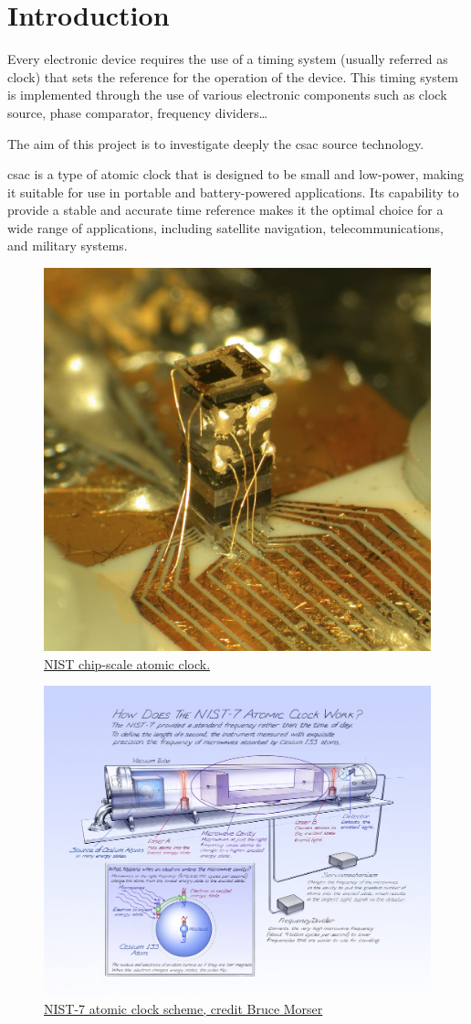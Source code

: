 \section{Introduction}
\label{sec:introduction}

Every electronic device requires the use of a timing system (usually referred as clock) that sets the reference for the operation of the device.
This timing system is implemented through the use of various electronic components such as clock source, phase comparator, frequency dividers\dots

The aim of this project is to investigate deeply the \acrfull{csac} source technology.

\acrshort{csac} is a type of atomic clock that is designed to be small and low-power, making it suitable for use in portable and battery-powered applications.
Its capability to provide a stable and accurate time reference makes it the optimal choice for a wide range of applications, including satellite navigation, telecommunications, and military systems.

\begin{figure}[H]
    \centering
    \includegraphics[width=.5\textwidth]{img/first_atomic_clock.jpg}
    \caption{\href{https://www.nist.gov/news-events/news/2004/08/nist-unveils-chip-scale-atomic-clock}{NIST chip-scale atomic clock.}}
\end{figure}

\begin{figure}[H]
    \centering
    \includegraphics[width=.6\textwidth]{img/cesium_atomic_clock_scheme.jpg}
    \caption{\href{https://timeandnavigation.si.edu/multimedia-asset/how-does-the-nist-7-atomic-clock-work}{NIST-7 atomic clock scheme, credit Bruce Morser}}
\end{figure}

